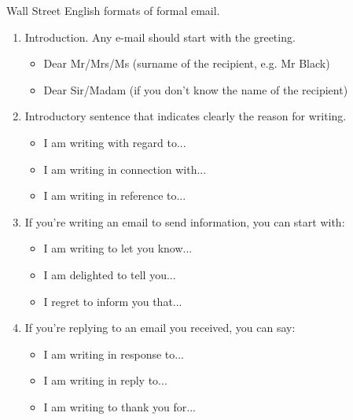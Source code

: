 \documentclass{beamer}
\begin{document}
\begin{frame}{Wall Street English \cite{WallStreet} formats of formal email.}
  \begin{enumerate}
    \item Introduction. Any e-mail should start with the greeting.
          \begin{itemize}
            \item Dear Mr/Mrs/Ms (surname of the recipient, e.g. Mr Black)
            \item Dear Sir/Madam (if you don't know the name of the recipient)
          \end{itemize}
    \item Introductory sentence that indicates clearly the reason for writing.
          \begin{itemize}
            \item I am writing with regard to...
            \item I am writing in connection with...
            \item I am writing in reference to...
          \end{itemize}
    \item If you're writing an email to send information, you can start with:
          \begin{itemize}
            \item I am writing to let you know...
            \item I am delighted to tell you...
            \item I regret to inform you that...
          \end{itemize}
    \item If you're replying to an email you received, you can say:
          \begin{itemize}
            \item I am writing in response to...
            \item I am writing in reply to...
            \item I am writing to thank you for...
          \end{itemize}
  \end{enumerate}
\end{frame}
\end{document}

